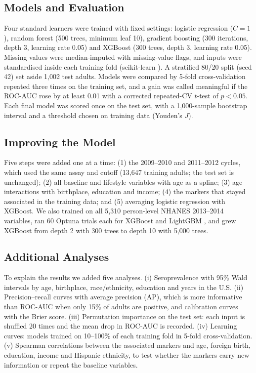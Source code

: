 \documentclass[conference]{IEEEtran}
\begin{document}
\subsection{Models and Evaluation}
Four standard learners were trained with fixed settings: logistic regression ($C=1$), random forest (500 trees, minimum leaf 10),
gradient boosting (300 iterations, depth 3, learning rate 0.05) and XGBoost \cite{xgboost} (300 trees, depth 3, learning rate 0.05).
Missing values were median-imputed with missing-value flags, and inputs were standardised inside each training fold (scikit-learn
\cite{sklearn}). A stratified 80/20 split (seed 42) set aside 1,002 test adults. Models were compared by 5-fold cross-validation
repeated three times on the training set, and a gain was called meaningful if the ROC-AUC rose by at least 0.01 with a corrected
repeated-CV $t$-test \cite{nadeau2003} of $p<0.05$. Each final model was scored once on the test set, with a 1,000-sample bootstrap
interval and a threshold chosen on training data (Youden's $J$).

\subsection{Improving the Model}
Five steps were added one at a time: (1) the 2009--2010 and 2011--2012 cycles, which used the same assay and cutoff (13,647 training
adults; the test set is unchanged); (2) all baseline and lifestyle variables with age as a spline; (3) age interactions with
birthplace, education and income; (4) the markers that stayed associated in the training data; and (5) averaging logistic regression
with XGBoost. We also trained on all 5,310 person-level NHANES 2013--2014 variables, ran 60 Optuna \cite{optuna} trials each for
XGBoost and LightGBM \cite{lightgbm}, and grew XGBoost from depth 2 with 300 trees to depth 10 with 5,000 trees.

\subsection{Additional Analyses}
To explain the results we added five analyses. (i) Seroprevalence with 95\% Wald intervals by age, birthplace, race/ethnicity,
education and years in the U.S. (ii) Precision--recall curves with average precision (AP), which is more informative than ROC-AUC when
only 15\% of adults are positive, and calibration curves with the Brier score. (iii) Permutation importance on the test set: each input
is shuffled 20 times and the mean drop in ROC-AUC is recorded. (iv) Learning curves: models trained on 10--100\% of each training
fold in 5-fold cross-validation. (v) Spearman correlations between the associated markers and age, foreign birth, education, income and
Hispanic ethnicity, to test whether the markers carry new information or repeat the baseline variables.
\end{document}
